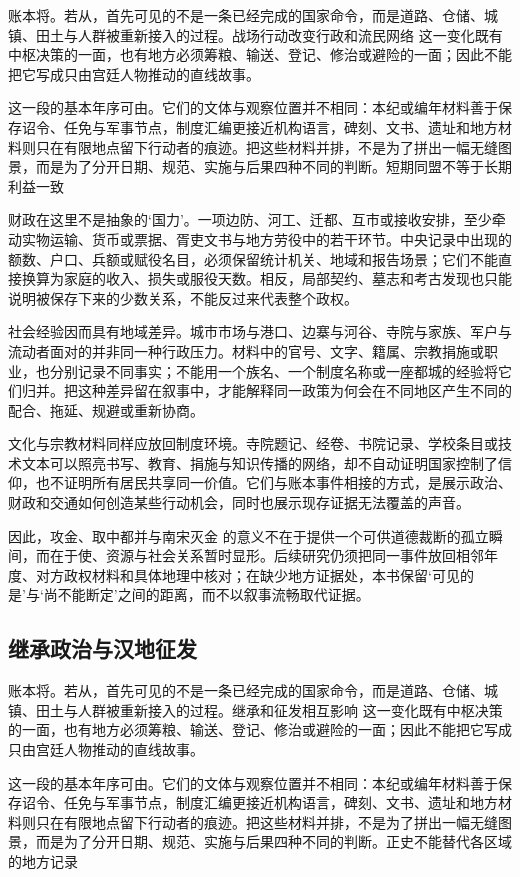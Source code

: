 账本将。若从，首先可见的不是一条已经完成的国家命令，而是道路、仓储、城镇、田土与人群被重新接入的过程。战场行动改变行政和流民网络 这一变化既有中枢决策的一面，也有地方必须筹粮、输送、登记、修治或避险的一面；因此不能把它写成只由宫廷人物推动的直线故事。

这一段的基本年序可由。它们的文体与观察位置并不相同：本纪或编年材料善于保存诏令、任免与军事节点，制度汇编更接近机构语言，碑刻、文书、遗址和地方材料则只在有限地点留下行动者的痕迹。把这些材料并排，不是为了拼出一幅无缝图景，而是为了分开日期、规范、实施与后果四种不同的判断。短期同盟不等于长期利益一致

财政在这里不是抽象的‘国力’。一项边防、河工、迁都、互市或接收安排，至少牵动实物运输、货币或票据、胥吏文书与地方劳役中的若干环节。中央记录中出现的额数、户口、兵额或赋役名目，必须保留统计机关、地域和报告场景；它们不能直接换算为家庭的收入、损失或服役天数。相反，局部契约、墓志和考古发现也只能说明被保存下来的少数关系，不能反过来代表整个政权。

社会经验因而具有地域差异。城市市场与港口、边寨与河谷、寺院与家族、军户与流动者面对的并非同一种行政压力。材料中的官号、文字、籍属、宗教捐施或职业，也分别记录不同事实；不能用一个族名、一个制度名称或一座都城的经验将它们归并。把这种差异留在叙事中，才能解释同一政策为何会在不同地区产生不同的配合、拖延、规避或重新协商。

文化与宗教材料同样应放回制度环境。寺院题记、经卷、书院记录、学校条目或技术文本可以照亮书写、教育、捐施与知识传播的网络，却不自动证明国家控制了信仰，也不证明所有居民共享同一价值。它们与账本事件相接的方式，是展示政治、财政和交通如何创造某些行动机会，同时也展示现存证据无法覆盖的声音。

因此，攻金、取中都并与南宋灭金 的意义不在于提供一个可供道德裁断的孤立瞬间，而在于使、资源与社会关系暂时显形。后续研究仍须把同一事件放回相邻年度、对方政权材料和具体地理中核对；在缺少地方证据处，本书保留‘可见的是’与‘尚不能断定’之间的距离，而不以叙事流畅取代证据。

\subsection{继承政治与汉地征发}

账本将。若从，首先可见的不是一条已经完成的国家命令，而是道路、仓储、城镇、田土与人群被重新接入的过程。继承和征发相互影响 这一变化既有中枢决策的一面，也有地方必须筹粮、输送、登记、修治或避险的一面；因此不能把它写成只由宫廷人物推动的直线故事。

这一段的基本年序可由。它们的文体与观察位置并不相同：本纪或编年材料善于保存诏令、任免与军事节点，制度汇编更接近机构语言，碑刻、文书、遗址和地方材料则只在有限地点留下行动者的痕迹。把这些材料并排，不是为了拼出一幅无缝图景，而是为了分开日期、规范、实施与后果四种不同的判断。正史不能替代各区域的地方记录

